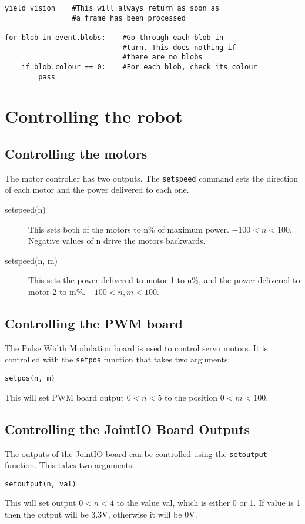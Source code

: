 \documentclass{article}
\begin{document}
\begin{verbatim}
yield vision    #This will always return as soon as
                #a frame has been processed

for blob in event.blobs:    #Go through each blob in 
                            #turn. This does nothing if
                            #there are no blobs
    if blob.colour == 0:    #For each blob, check its colour
        pass
\end{verbatim}

\section{Controlling the robot}
\subsection{Controlling the motors}
The motor controller has two outputs.  The \texttt{setspeed} command
sets the direction of each motor and the power delivered to each one.

\begin{description}
\item[setspeed(n)] This sets both of the motors to n\% of maximum
power.  $-100<n<100$. Negative values of n drive the motors backwards.
\item[setspeed(n, m)] This sets the power delivered to motor 1 to n\%,
  and the power delivered to motor 2 to m\%. $-100<n,m<100$.
\end{description}

\subsection{Controlling the PWM board}
The Pulse Width Modulation board is used to control servo motors.  It is
controlled with the \texttt{setpos} function that takes two arguments:

\begin{verbatim}
setpos(n, m)
\end{verbatim}

This will set PWM board output $0<n<5$ to the position $0<m<100$.

\subsection{Controlling the JointIO Board Outputs}
The outputs of the JointIO board can be controlled using the \texttt{setoutput} function.  This takes two arguments:

\begin{verbatim}
setoutput(n, val)
\end{verbatim}

This will set output $0<n<4$ to the value val, which is either 0 or 1.  If value is 1 then the output will be 3.3V, otherwise it will be 0V.
\end{document}
